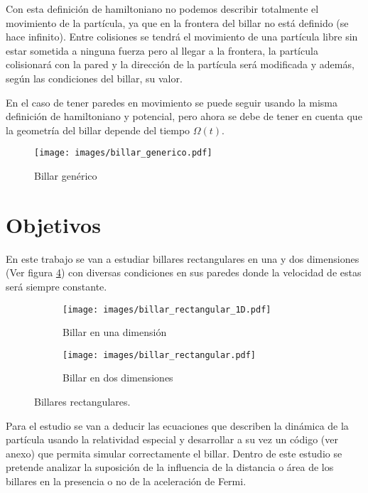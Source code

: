Con esta definición de hamiltoniano no podemos describir totalmente el movimiento de la partícula, ya que en la frontera del billar no está definido (se hace infinito). Entre colisiones se tendrá el movimiento de una partícula libre sin estar sometida a ninguna fuerza pero al llegar a la frontera, la partícula colisionará con la pared y la dirección de la partícula será modificada y además, según las condiciones del billar, su valor. 

\vspace{3mm}

En el caso de tener paredes en movimiento se puede seguir usando la misma definición de hamiltoniano y potencial, pero ahora se debe de tener en cuenta que la geometría del billar depende del tiempo \( \Omega(t) \).

\begin{figure}[H]
    \centering
    \texttt{[image: images/billar\_generico.pdf]}
    \caption{Billar genérico}
    \label{fig:bilar_generico}
\end{figure}


\section{Objetivos}

En este trabajo se van a estudiar billares rectangulares en una y dos dimensiones (Ver figura \ref{fig:billar_rectangular}) con diversas condiciones en sus paredes donde la velocidad de estas será siempre constante.

\begin{figure}[H]
    \centering
    \begin{subfigure}[b]{0.5\textwidth}
        \centering
        \texttt{[image: images/billar\_rectangular\_1D.pdf]}
        \caption{Billar en una dimensión}
        \label{fig:billar_rectangular_1D}
    \end{subfigure}
    \hfill
    \begin{subfigure}[b]{0.49\textwidth}
        \centering
        \texttt{[image: images/billar\_rectangular.pdf]}
        \caption{Billar en dos dimensiones}
        \label{fig:billar_rectangular_2D}
    \end{subfigure}
    \caption{Billares rectangulares.}
        \label{fig:billar_rectangular}
\end{figure}

Para el estudio se van a deducir las ecuaciones que describen la dinámica de la partícula usando la relatividad especial y desarrollar a su vez un código (ver anexo) que permita simular correctamente el billar. Dentro de este estudio se pretende analizar la suposición de la influencia de la distancia o área de los billares en la presencia o no de la aceleración de Fermi. 

